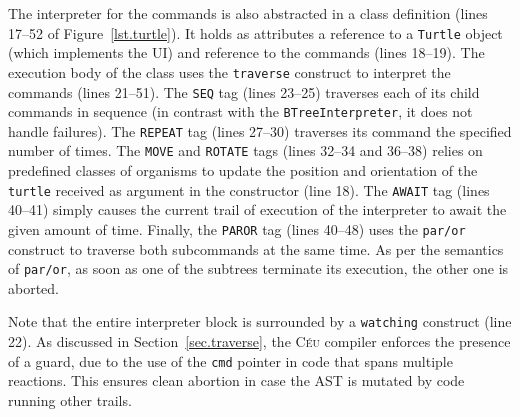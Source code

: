 \documentclass{sig-alternate}
\newcommand{\CEU}{\textsc{C\'{e}u}\xspace}
\newcommand{\code}[1] {{\small{\texttt{#1}}}}
\begin{document}
The interpreter for the commands is also abstracted in a class definition 
(lines 17--52 of Figure~\ref{lst.turtle}).
%
It holds as attributes a reference to a \code{Turtle} object (which implements 
the UI) and reference to the commands (lines 18--19).
The execution body of the class uses the \code{traverse} construct to interpret 
the commands (lines 21--51).
%
The \code{SEQ} tag (lines 23--25) traverses each of its child commands in 
sequence (in contrast with the \code{BTreeInterpreter}, it does not handle 
failures).
%
The \code{REPEAT} tag (lines 27--30) traverses its command the specified number 
of times.
%
The \code{MOVE} and \code{ROTATE} tags (lines 32--34 and 36--38) relies on 
predefined classes of organisms to update the position and orientation of the 
\code{turtle} received as argument in the constructor (line 18).
%
The \code{AWAIT} tag (lines 40--41) simply causes the current trail of 
execution of the interpreter to await the given amount of time.
%
Finally, the \code{PAROR} tag (lines 40--48) uses the \code{par/or} construct
to traverse both subcommands at the same time. As per the semantics of
\code{par/or}, as soon as one of the subtrees terminate its execution,
the other one is aborted.

Note that the entire interpreter block is surrounded by a \code{watching}
construct (line 22).
As discussed in Section~\ref{sec.traverse}, the \CEU compiler enforces the 
presence of a guard, due to the use of the \code{cmd} pointer in code that 
spans multiple reactions. This ensures clean abortion in case the AST is 
mutated by code running other trails.
\end{document}
